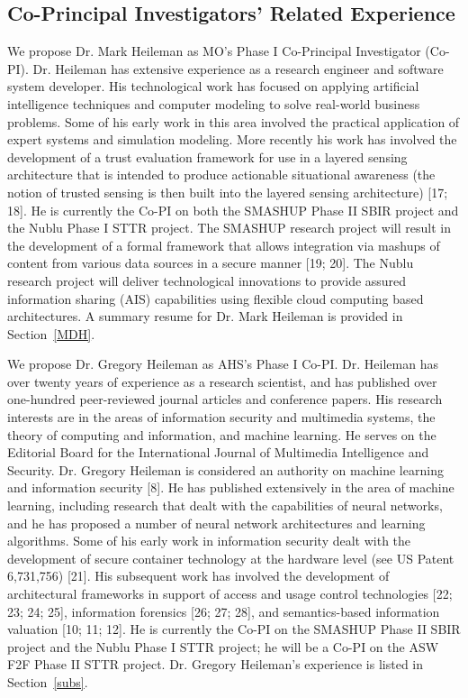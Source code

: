 \documentclass{sbir}
\begin{document}
\subsection{Co-Principal Investigators' Related Experience}
We propose Dr. Mark Heileman as MO's Phase I Co-Principal Investigator (Co-PI). Dr. Heileman has extensive experience as a research engineer and software system developer. His technological work has focused on applying artificial intelligence techniques and computer modeling to solve real-world business problems. Some of his early work in this area involved the practical application of expert systems and simulation modeling. More recently his work has involved the development of a trust evaluation framework for use in a layered sensing architecture that is intended to produce actionable situational awareness (the notion of trusted sensing is then built into the layered sensing architecture) [17; 18]. He is currently the Co-PI on both the SMASHUP Phase II SBIR project and the Nublu Phase I STTR project. The SMASHUP research project will result in the development of a formal framework that allows integration via mashups of content from various data sources in a secure manner [19; 20]. The Nublu research project will deliver technological innovations to provide assured information sharing (AIS) capabilities using flexible cloud computing based architectures. A summary resume for Dr. Mark Heileman is provided in Section~\ref{MDH}.

We propose Dr. Gregory Heileman as AHS's Phase I Co-PI. Dr. Heileman has over twenty years of experience as a research scientist, and has published over one-hundred peer-reviewed journal articles and conference papers. His research interests are in the areas of information security and multimedia systems, the theory of computing and information, and machine learning. He serves on the Editorial Board for the International Journal of Multimedia Intelligence and Security. Dr. Gregory Heileman is considered an authority on machine learning and information security [8]. He has published extensively in the area of machine learning, including research that dealt with the capabilities of neural networks, and he has proposed a number of neural network architectures and learning algorithms. Some of his early work in information security dealt with the development of secure container technology at the hardware level (see US Patent 6,731,756) [21]. His subsequent work has involved the development of architectural frameworks in support of access and usage control technologies [22; 23; 24; 25], information forensics [26; 27; 28], and semantics-based information valuation [10; 11; 12]. He is currently the Co-PI on the SMASHUP Phase II SBIR project and the Nublu Phase I STTR project; he will be a Co-PI on the ASW F2F Phase II STTR project. Dr. Gregory Heileman's experience is listed in Section~\ref{subs}.
\end{document}
